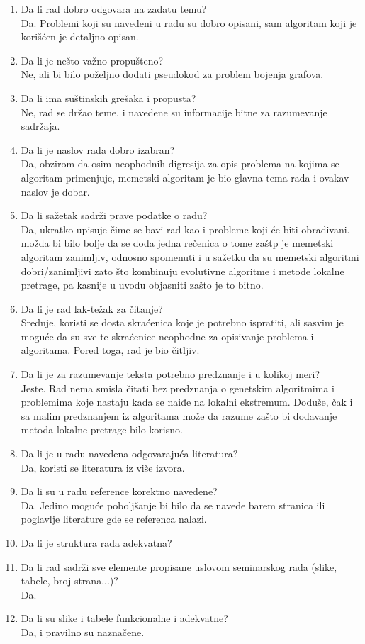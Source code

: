 \documentclass[a4paper]{report}
\begin{document}
\begin{enumerate}
\item Da li rad dobro odgovara na zadatu temu?\\
Da. Problemi koji su navedeni u radu su dobro opisani, sam algoritam koji je korišćen je detaljno opisan. 
\item Da li je nešto važno propušteno?\\
Ne, ali bi bilo poželjno dodati pseudokod za problem bojenja grafova.
\item Da li ima suštinskih grešaka i propusta?\\
Ne, rad se držao teme, i navedene su informacije bitne za razumevanje sadržaja. 
\item Da li je naslov rada dobro izabran?\\
Da, obzirom da osim neophodnih digresija za opis problema na kojima se algoritam primenjuje, memetski algoritam je bio glavna tema rada i ovakav naslov je dobar.
\item Da li sažetak sadrži prave podatke o radu?\\
Da, ukratko upisuje čime se bavi rad kao i probleme koji će biti obrađivani. možda bi bilo bolje da se doda jedna rečenica o tome zaštp je memetski algoritam zanimljiv, odnosno spomenuti i u sažetku da su memetski algoritmi dobri/zanimljivi zato što kombinuju evolutivne algoritme i metode lokalne pretrage, pa kasnije u uvodu objasniti zašto je to bitno.
\item Da li je rad lak-težak za čitanje?\\
Srednje, koristi se dosta skraćenica koje je potrebno ispratiti, ali sasvim je moguće da su sve te skraćenice neophodne za opisivanje problema i algoritama. Pored toga, rad je bio čitljiv.
\item Da li je za razumevanje teksta potrebno predznanje i u kolikoj meri?\\
Jeste. Rad nema smisla čitati bez predznanja o genetskim algoritmima i problemima koje nastaju kada se naiđe na lokalni ekstremum. Doduše, čak i sa malim predznanjem iz algoritama može da razume zašto bi dodavanje metoda lokalne pretrage bilo korisno.
\item Da li je u radu navedena odgovarajuća literatura?\\
Da, koristi se literatura iz više izvora.
\item Da li su u radu reference korektno navedene?\\
Da. Jedino moguće poboljšanje bi bilo da se navede barem stranica ili poglavlje literature gde se referenca nalazi.
\item Da li je struktura rada adekvatna?\\
\item Da li rad sadrži sve elemente propisane uslovom seminarskog rada (slike, tabele, broj strana...)?\\
Da.
\item Da li su slike i tabele funkcionalne i adekvatne?\\
Da, i pravilno su naznačene.
\end{enumerate}
\end{document}
